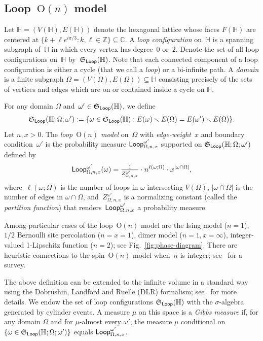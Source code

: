 \documentclass[11pt,letterpaper]{amsart}
\newcounter{n}
\numberwithin{n}{section}
\theoremstyle{plain}
\theoremstyle{definition}
\theoremstyle{remark}
\renewcommand\setminus\smallsetminus
\renewcommand\O[1]{\(\mathrm{O}(#1)\)}
\newcommand\Z{\mathbb Z}
\renewcommand\H{\mathbb H}
\newcommand\muLoop{{\sf Loop}}
\newcommand\hexlattice{{\mathbb H}}
\newcommand\spaceLoop[1]{\mathfrak{S}_{\muLoop}(#1)}
\newcommand\face{F}
\newcommand\faces[1]{\face(#1)}
\newcommand\domain\Omega
\newcommand\vertices[1]{{V(#1)}}
\newcommand\edges[1]{{E(#1)}}
\newcommand{\1}{\mathbbm{1}}
\renewcommand\subset\subseteq
\begin{document}
\subsection{Loop~\O{n} model} \label{sec:loopon}

 Let $\hexlattice=(\vertices{\hexlattice},\edges{\hexlattice})$ denote the
hexagonal lattice whose faces $\faces{\hexlattice}$ are centered at $\{k+\ell
e^{i\pi/3}:k,\ell\in\Z\}\subset\mathbb C$. 
A \emph{loop configuration} on~$\H$ is a spanning subgraph of~$\H$ in which every vertex has degree~$0$ or~$2$.
Denote the set of all loop configurations on~$\H$ by~$\spaceLoop{\H}$.
Note that each connected component of a loop configuration is either a cycle (that we call a {\em loop}) or a bi-infinite path.
A \emph{domain} is a finite subgraph $\domain=(\vertices{\domain},\edges{\domain})\subset\hexlattice$ consisting precisely of the
sets of vertices and edges which are on or contained inside a cycle on
$\hexlattice$.  

For any domain $\domain$ and~${\omega'}\in \spaceLoop{\H}$, we define
\[
\spaceLoop{\H;\domain;{\omega'}}
:=
\{
	\omega\in\spaceLoop{\H}
	:
	\edges{\omega}\setminus\edges{\domain}
	=
	\edges{{\omega'}}\setminus\edges{\domain}
\}.
\]
Let $n,x > 0$.  The \emph{loop~\O{n} model} on~$\domain$ with \emph{edge-weight}~$x$ and boundary condition~$\omega'$ is the probability measure $\muLoop_{\domain,n,x}^{\omega'}$ supported on $\spaceLoop{\H;\domain;{\omega'}}$ defined by
\[
	\muLoop_{\domain,n,x}^{\omega'}(\omega) = \tfrac{1}{Z_{\domain,n,x}^{\omega'}} \cdot  n^{\ell(\omega;\domain)}\cdot x^{|\omega\cap\domain|},
\]
where~$\ell(\omega;\domain)$ is the number of loops in $\omega$ intersecting $\vertices{\domain}$,
$|\omega\cap\Omega|$ is the number of edges in $\omega\cap\Omega$, and~$Z_{\domain,n,x}^{\omega'}$ is a normalizing
	constant (called the {\em partition function}) that
	renders~$\muLoop_{\domain,n,x}^{\omega'}$ a probability measure.

 Among particular cases of the loop~\O{n} model are the Ising model ($n=1$), $1/2$ Bernoulli site percolation ($n=x=1$), dimer model ($n=1,x=\infty$), integer-valued 1-Lipschitz function ($n=2$); see Fig.~\ref{fig:phase-diagram}.
There are heuristic connections to the spin~\O{n} model when~$n$ is integer; see~\cite{PelSpi17} for a survey.

The above definition can be extended to the infinite volume in a standard way using the Dobrushin, Landford and Ruelle (DLR) formalism; see~\cite{GlaLam25} for more details. We endow the set of loop configurations $\spaceLoop{\H}$ with the $\sigma$-algebra generated by cylinder events. A measure $\mu$ on this space is a \emph{Gibbs measure}
	if, for any domain $\domain$
	and for $\mu$-almost every ${\omega'}$,
	the measure $\mu$ conditional on $\{\omega\in\spaceLoop{\H;\domain;{\omega'}}\}$
	equals $\muLoop_{\domain,n,x}^{\omega'}$.
\end{document}
